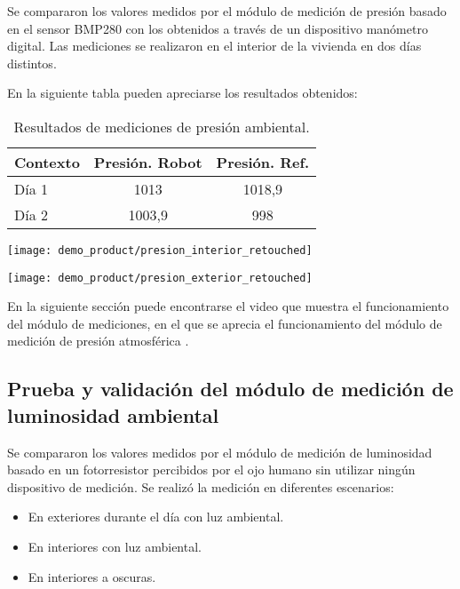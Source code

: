 Se compararon los valores medidos por el módulo de medición de presión basado en el sensor BMP280 con los obtenidos a través de un dispositivo manómetro digital. Las mediciones se realizaron en el interior de la vivienda en dos días distintos.

En la siguiente tabla pueden apreciarse los resultados obtenidos:

\begin{table}[h]
\centering
\caption[Resultados de mediciones de presión ambiental.]{Resultados de mediciones de presión ambiental.}
\begin{tabular}{l c c}
\toprule
\textbf{Contexto} & \textbf{Presión. Robot} & \textbf{Presión. Ref.} \\
\midrule
Día 1 & 1013 & 1018,9 \\
Día 2 & 1003,9 & 998 \\
\bottomrule
\hline
\end{tabular}
\end{table}

\begin{center}
\texttt{[image: demo\_product/presion\_interior\_retouched]}
  \label{fig:humedad_interior}
\end{center}

\begin{center}
\texttt{[image: demo\_product/presion\_exterior\_retouched]}
  \label{fig:humedad_interior}
\end{center}


En la siguiente sección puede encontrarse el video que muestra el funcionamiento del módulo de mediciones, en el que se aprecia el funcionamiento del módulo de medición de presión atmosférica \cite{Demo_Mediciones}.

\subsection{Prueba y validación del módulo de medición de luminosidad ambiental}

Se compararon los valores medidos por el módulo de medición de luminosidad basado en un fotorresistor percibidos por el ojo humano sin utilizar ningún dispositivo de medición. Se realizó la medición en diferentes escenarios:

\begin{itemize}
	\item En exteriores durante el día con luz ambiental.
	\item En interiores con luz ambiental.
	\item En interiores a oscuras.
\end{itemize}

